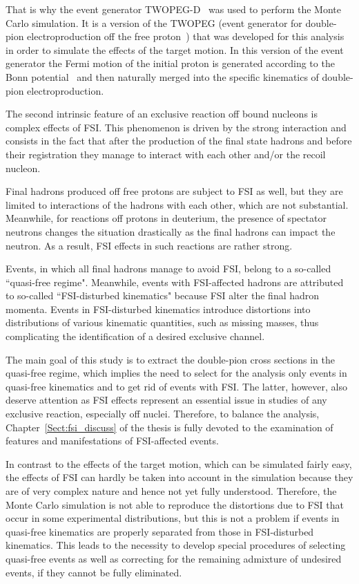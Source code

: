 That is why the event generator TWOPEG-D~\cite{twopeg-d} was used to perform the Monte Carlo simulation. It is a version of the TWOPEG (event generator for double-pion electroproduction off the free proton~\cite{twopeg}) that was developed for this analysis in order to simulate the effects of the target motion. In this version of the event generator the Fermi motion of the initial proton is generated according to the Bonn potential~\cite{Machleidt:1987hj} and then naturally merged into the specific kinematics of double-pion electroproduction.


The second intrinsic feature of an exclusive reaction off bound nucleons is complex effects of FSI. This phenomenon is driven by the strong interaction and consists in the fact that after the production of the final state hadrons and before their registration they manage to interact with each other and/or the recoil nucleon. 

Final hadrons produced off free protons are subject to FSI as well, but they are limited to interactions of the hadrons with each other, which are not substantial. Meanwhile, for reactions off protons in deuterium, the presence of spectator neutrons changes the situation drastically as the final hadrons can impact the neutron. As a result, FSI effects in such reactions are rather strong. 


Events, in which all final hadrons manage to avoid FSI, belong to a so-called ``quasi-free regime". Meanwhile, events with FSI-affected hadrons are attributed to so-called ``FSI-disturbed kinematics" because FSI alter the final hadron momenta. Events in FSI-disturbed kinematics introduce distortions into distributions of various kinematic quantities, such as missing masses, thus complicating the identification of a desired exclusive channel.


The main goal of this study is to extract the double-pion cross sections in the quasi-free regime, which implies the need to select for the analysis only events in quasi-free kinematics and to get rid of events with FSI. The latter, however, also deserve attention as FSI effects represent an essential issue in studies of any exclusive reaction, especially off nuclei. Therefore, to balance the analysis, Chapter~\ref{Sect:fsi_discuss} of the thesis is fully devoted to the examination of features and manifestations of FSI-affected events.


In contrast to the effects of the target motion, which can be simulated fairly easy, the effects of FSI can hardly be taken into account in the simulation because they are of very complex nature and hence not yet fully understood. Therefore, the Monte Carlo simulation is not able to reproduce the distortions due to FSI that occur in some experimental distributions, but this is not a problem if events in quasi-free kinematics are properly separated from those in FSI-disturbed kinematics. This leads to the necessity to develop special procedures of selecting quasi-free events as well as correcting for the remaining admixture of undesired events, if they cannot be fully eliminated.


